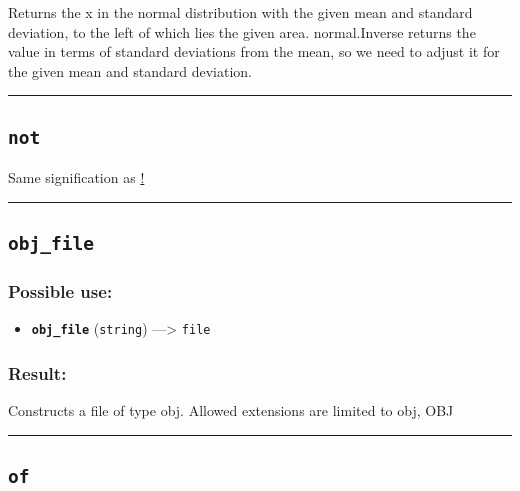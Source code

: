 \documentclass[]{book}
\providecommand{\tightlist}{%
  \setlength{\itemsep}{0pt}\setlength{\parskip}{0pt}}
\theoremstyle{definition}
\theoremstyle{definition}
\theoremstyle{definition}
\theoremstyle{remark}
\begin{document}
Returns the x in the normal distribution with the given mean and
standard deviation, to the left of which lies the given area.
normal.Inverse returns the value in terms of standard deviations from
the mean, so we need to adjust it for the given mean and standard
deviation.

\begin{center}\rule{0.5\linewidth}{\linethickness}\end{center}

\subsection{\texorpdfstring{\texttt{not}}{not}}\label{not}

Same signification as \href{operators-a-to-a.html\#!}{!}

\begin{center}\rule{0.5\linewidth}{\linethickness}\end{center}

\subsection{\texorpdfstring{\texttt{obj\_file}}{obj\_file}}\label{obj_file}

\subsubsection{Possible use:}\label{possible-use-380}

\begin{itemize}
\tightlist
\item
  \textbf{\texttt{obj\_file}} (\texttt{string}) ---\textgreater{}
  \texttt{file}
\end{itemize}

\subsubsection{Result:}\label{result-366}

Constructs a file of type obj. Allowed extensions are limited to obj,
OBJ

\begin{center}\rule{0.5\linewidth}{\linethickness}\end{center}

\subsection{\texorpdfstring{\texttt{of}}{of}}\label{of}
\end{document}
